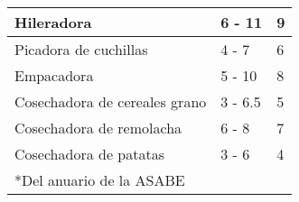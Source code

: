 \documentclass{article}
\begin{document}
\begin{table}[]
\begin{tabular}{lll}
			\multicolumn{1}{|l|}{Hileradora}                      & \multicolumn{1}{l|}{6 - 11}                                                           & \multicolumn{1}{l|}{9}                                                                      \\ \hline
			\multicolumn{1}{|l|}{Picadora de   cuchillas}         & \multicolumn{1}{l|}{4 - 7}                                                            & \multicolumn{1}{l|}{6}                                                                      \\ \hline
			\multicolumn{1}{|l|}{Empacadora}                      & \multicolumn{1}{l|}{5 - 10}                                                           & \multicolumn{1}{l|}{8}                                                                      \\ \hline
			\multicolumn{1}{|l|}{Cosechadora de   cereales grano} & \multicolumn{1}{l|}{3 - 6.5}                                                          & \multicolumn{1}{l|}{5}                                                                      \\ \hline
			\multicolumn{1}{|l|}{Cosechadora de   remolacha}      & \multicolumn{1}{l|}{6 - 8}                                                            & \multicolumn{1}{l|}{7}                                                                      \\ \hline
			\multicolumn{1}{|l|}{Cosechadora de   patatas}        & \multicolumn{1}{l|}{3 - 6}                                                            & \multicolumn{1}{l|}{4}                                                                      \\ \hline
			*Del anuario de la ASABE                              &                                                                                       &                                                                                            
		\end{tabular}
	\end{table}
	
\end{document}
